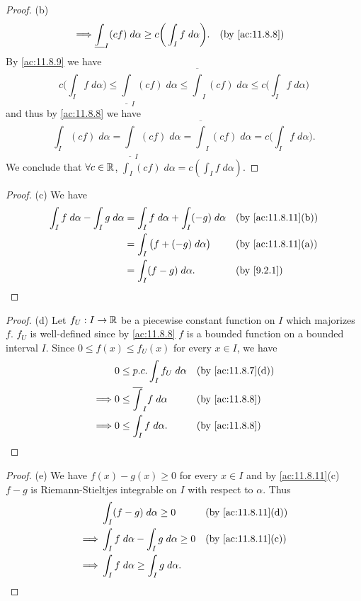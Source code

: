 \begin{proof}{(b)}
\begin{align*}
    \implies & \underline{\int}_I (cf) \; d \alpha \geq c\bigg(\int_I f \; d \alpha\bigg).                                                         &  & \text{(by \cref{ac:11.8.8})}
  \end{align*}
  By \cref{ac:11.8.9} we have
  \[
    c\bigg(\int_I f \; d \alpha\bigg) \leq \underline{\int}_I (cf) \; d \alpha \leq \overline{\int}_I (cf) \; d \alpha \leq c\bigg(\int_I f \; d \alpha\bigg)
  \]
  and thus by \cref{ac:11.8.8} we have
  \[
    \int_I (cf) \; d \alpha = \underline{\int}_I (cf) \; d \alpha = \overline{\int}_I (cf) \; d \alpha = c\bigg(\int_I f \; d \alpha\bigg).
  \]
  We conclude that \(\forall c \in \mathbb{R}\), \(\int_I (cf) \; d \alpha = c (\int_I f \; d \alpha)\).
\end{proof}

\begin{proof}{(c)}
  We have
  \begin{align*}
    \int_I f \; d \alpha - \int_I g \; d \alpha & = \int_I f \; d \alpha + \int_I (-g) \; d \alpha &  & \text{(by \cref{ac:11.8.11}(b))} \\
                                                & = \int_I \big(f + (-g) \; d \alpha\big)          &  & \text{(by \cref{ac:11.8.11}(a))} \\
                                                & = \int_I (f - g) \; d \alpha.                    &  & \by{9.2.1}
  \end{align*}
\end{proof}

\begin{proof}{(d)}
  Let \(f_U : I \to \mathbb{R}\) be a piecewise constant function on \(I\) which majorizes \(f\).
  \(f_U\) is well-defined since by \cref{ac:11.8.8} \(f\) is a bounded function on a bounded interval \(I\).
  Since \(0 \leq f(x) \leq f_U(x)\) for every \(x \in I\), we have
  \begin{align*}
             & 0 \leq p.c. \int_I f_U \; d \alpha     &  & \text{(by \cref{ac:11.8.7}(d))} \\
    \implies & 0 \leq \overline{\int}_I f \; d \alpha &  & \text{(by \cref{ac:11.8.8})}    \\
    \implies & 0 \leq \int_I f \; d \alpha.           &  & \text{(by \cref{ac:11.8.8})}
  \end{align*}
\end{proof}

\begin{proof}{(e)}
  We have \(f(x) - g(x) \geq 0\) for every \(x \in I\) and by \cref{ac:11.8.11}(c) \(f - g\) is Riemann-Stieltjes integrable on \(I\) with respect to \(\alpha\).
  Thus
  \begin{align*}
             & \int_I (f - g) \; d \alpha \geq 0                  &  & \text{(by \cref{ac:11.8.11}(d))} \\
    \implies & \int_I f \; d \alpha - \int_I g \; d \alpha \geq 0 &  & \text{(by \cref{ac:11.8.11}(c))} \\
    \implies & \int_I f \; d \alpha \geq \int_I g \; d \alpha.
  \end{align*}
\end{proof}

